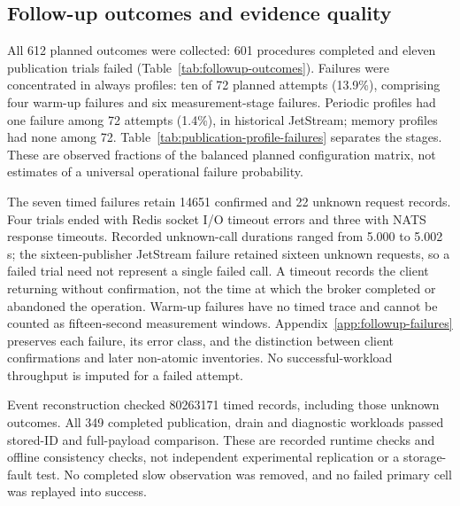 \subsection{Follow-up outcomes and evidence quality}

All 612 planned outcomes were collected: 601 procedures completed and eleven publication trials failed (Table~\ref{tab:followup-outcomes}). Failures were concentrated in always profiles: ten of 72 planned attempts (13.9\%), comprising four warm-up failures and six measurement-stage failures. Periodic profiles had one failure among 72 attempts (1.4\%), in historical JetStream; memory profiles had none among 72. Table~\ref{tab:publication-profile-failures} separates the stages. These are observed fractions of the balanced planned configuration matrix, not estimates of a universal operational failure probability.

The seven timed failures retain 14651 confirmed and 22 unknown request records. Four trials ended with Redis socket I/O timeout errors and three with NATS response timeouts. Recorded unknown-call durations ranged from 5.000 to 5.002 s; the sixteen-publisher JetStream failure retained sixteen unknown requests, so a failed trial need not represent a single failed call. A timeout records the client returning without confirmation, not the time at which the broker completed or abandoned the operation. Warm-up failures have no timed trace and cannot be counted as fifteen-second measurement windows. Appendix~\ref{app:followup-failures} preserves each failure, its error class, and the distinction between client confirmations and later non-atomic inventories. No successful-workload throughput is imputed for a failed attempt.

\begin{table}[htbp]
\centering\small

\caption{Publication outcomes by append profile across both versions, publisher counts and all deployments. Warm-up and Timed count failures in those stages. Failure percentages use all 72 planned attempts per profile; warm-up failures never enter the timed publication phase.}
\label{tab:publication-profile-failures}
\end{table}

Event reconstruction checked 80263171 timed records, including those unknown outcomes. All 349 completed publication, drain and diagnostic workloads passed stored-ID and full-payload comparison. These are recorded runtime checks and offline consistency checks, not independent experimental replication or a storage-fault test. No completed slow observation was removed, and no failed primary cell was replayed into success.


